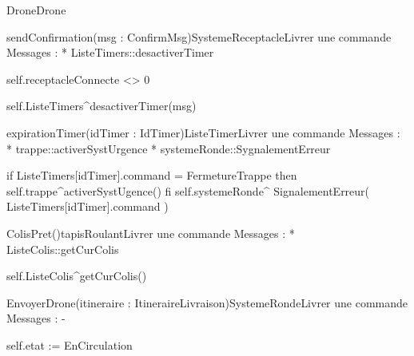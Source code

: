 \begin{OM}{Drone}{Drone}
\begin{OMOperation}{sendConfirmation(msg : ConfirmMsg)}{SystemeReceptacle}{Livrer une commande}
Messages :
* ListeTimers::{desactiverTimer}
\begin{OMPre}
self.receptacleConnecte <> 0
\end{OMPre}
\begin{OMPost}
        self.ListeTimers^desactiverTimer(msg)
    \end{OMPost}
\end{OMOperation}

\begin{OMOperation}{expirationTimer(idTimer : IdTimer)}{ListeTimer}{Livrer une commande}
Messages :
* trappe::{activerSystUrgence}
* systemeRonde::{SygnalementErreur}
\begin{OMPre}
\end{OMPre}
\begin{OMPost}
        if ListeTimers[idTimer].command = FermetureTrappe then
                self.trappe^activerSystUgence()
        fi
        self.systemeRonde^ SignalementErreur( ListeTimers[idTimer].command )
    \end{OMPost}
\end{OMOperation}

\begin{OMOperation}{ColisPret()}{tapisRoulant}{Livrer une commande}
Messages :
* ListeColis::{getCurColis}
\begin{OMPre}
\end{OMPre}
\begin{OMPost}
        self.ListeColis^getCurColis()
    \end{OMPost}
\end{OMOperation}

\begin{OMOperation}{EnvoyerDrone(itineraire : ItineraireLivraison)}{SystemeRonde}{Livrer une commande}
Messages : -
\begin{OMPre}
\end{OMPre}
\begin{OMPost}
        self.etat := EnCirculation
    \end{OMPost}
\end{OMOperation}
\end{OM}
